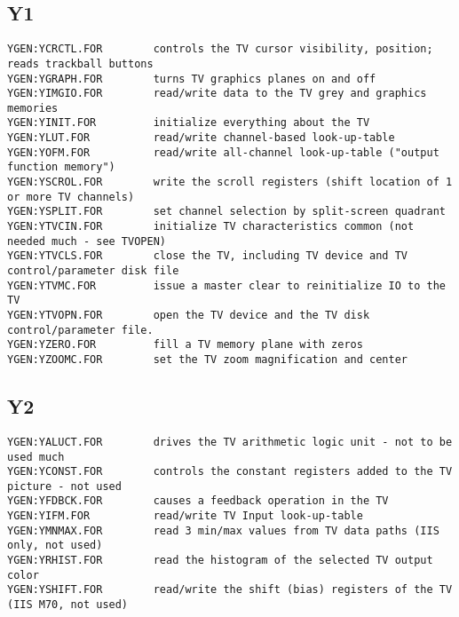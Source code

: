 \subsection{Y1}
\begin{verbatim}
YGEN:YCRCTL.FOR        controls the TV cursor visibility, position; reads trackball buttons
YGEN:YGRAPH.FOR        turns TV graphics planes on and off
YGEN:YIMGIO.FOR        read/write data to the TV grey and graphics memories
YGEN:YINIT.FOR         initialize everything about the TV
YGEN:YLUT.FOR          read/write channel-based look-up-table
YGEN:YOFM.FOR          read/write all-channel look-up-table ("output function memory")
YGEN:YSCROL.FOR        write the scroll registers (shift location of 1 or more TV channels)
YGEN:YSPLIT.FOR        set channel selection by split-screen quadrant
YGEN:YTVCIN.FOR        initialize TV characteristics common (not needed much - see TVOPEN)
YGEN:YTVCLS.FOR        close the TV, including TV device and TV control/parameter disk file
YGEN:YTVMC.FOR         issue a master clear to reinitialize IO to the TV
YGEN:YTVOPN.FOR        open the TV device and the TV disk control/parameter file.
YGEN:YZERO.FOR         fill a TV memory plane with zeros
YGEN:YZOOMC.FOR        set the TV zoom magnification and center
\end{verbatim}
 
\subsection{Y2}
\begin{verbatim}
YGEN:YALUCT.FOR        drives the TV arithmetic logic unit - not to be used much
YGEN:YCONST.FOR        controls the constant registers added to the TV picture - not used
YGEN:YFDBCK.FOR        causes a feedback operation in the TV
YGEN:YIFM.FOR          read/write TV Input look-up-table
YGEN:YMNMAX.FOR        read 3 min/max values from TV data paths (IIS only, not used)
YGEN:YRHIST.FOR        read the histogram of the selected TV output color
YGEN:YSHIFT.FOR        read/write the shift (bias) registers of the TV (IIS M70, not used)
\end{verbatim}
 
